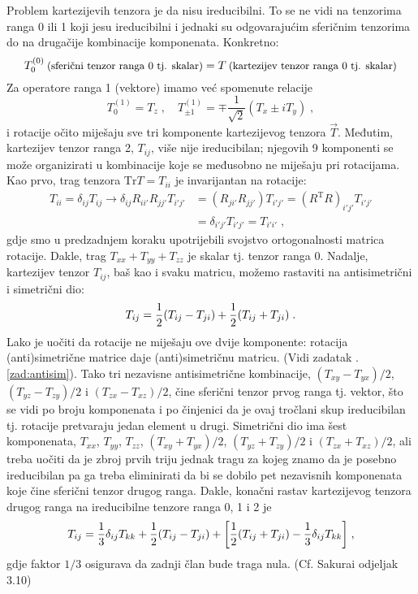 Problem kartezijevih tenzora je da nisu ireducibilni. To se ne
vidi na tenzorima ranga 0 ili 1 koji jesu ireducibilni i jednaki
su odgovarajućim sferičnim tenzorima do na drugačije kombinacije
komponenata. Konkretno:
\begin{equation}
T^{(0)}_0 \: \text{\small (sferični tenzor ranga 0 tj. skalar)}
 = T      \: \text{\small (kartezijev tenzor ranga 0 tj. skalar)}
\end{equation}
Za operatore ranga 1 (vektore) imamo već spomenute relacije
\begin{equation}
T^{(1)}_0 = T_z \;, \quad T^{(1)}_{\pm 1} = \mp \frac{1}{\sqrt{2}}
(T_x \pm i T_y) \;,
\label{eq:kartvektor}
\end{equation}
i rotacije očito miješaju sve tri komponente kartezijevog tenzora
$\vec{T}$. Međutim, kartezijev tenzor ranga 2, $T_{ij}$, više nije
ireducibilan; njegovih 9 komponenti se može organizirati u
kombinacije koje se međusobno ne miješaju pri rotacijama. 
Kao prvo, trag tenzora $\mathrm{Tr} T = T_{ii}$ je invarijantan
na rotacije:
\begin{align}
 T_{ii} = \delta_{ij} T_{ij} \longrightarrow
\delta_{ij} R_{i i'} R_{j j'} T_{i' j'}& = (R_{j i'} R_{j j'}) T_{i' j'}
= (R^{\mathrm{T}} R)_{i' j'} T_{i' j'} \\
& = \delta_{i' j'} T_{i' j'} = T_{i' i'} \;,
\end{align}
gdje smo u predzadnjem koraku upotrijebili svojstvo ortogonalnosti
matrica rotacije. Dakle, trag 
 $T_{xx} + T_{yy} + T_{zz}$ je skalar tj. tenzor ranga 0.
Nadalje, kartezijev tenzor $T_{ij}$, baš kao i svaku matricu, možemo
rastaviti na antisimetrični i simetrični dio:
\begin{equation}
  T_{ij} = \frac{1}{2} (T_{ij} - T_{ji}) + \frac{1}{2} (T_{ij} + T_{ji}) \;.
\label{eq:SplA}
\end{equation}
Lako je uočiti da rotacije ne miješaju ove dvije komponente:
rotacija (anti)si\-met\-ri\-čne matrice daje (anti)simetričnu matricu.
(Vidi zadatak \thechapter.\ref{zad:antisim}).
Tako tri nezavisne antisimetrične kombinacije, $(T_{xy}-T_{yx})/2$,
$(T_{yz}-T_{zy})/2$ i $(T_{zx} - T_{xz})/2$, čine sferični tenzor
prvog ranga tj. vektor, što se vidi po broju komponenata i po
činjenici da je ovaj tročlani skup ireducibilan tj. rotacije
pretvaraju jedan element u drugi.
Simetrični dio ima šest komponenata, $T_{xx}$, $T_{yy}$, $T_{zz}$,
$(T_{xy}+T_{yx})/2$, $(T_{yz}+T_{zy})/2$ i $(T_{zx} + T_{xz})/2$, 
ali treba uočiti da je zbroj prvih triju jednak tragu za kojeg
znamo da je posebno ireducibilan 
pa ga treba eliminirati da bi se dobilo pet
nezavisnih komponenata koje čine sferični tenzor drugog ranga.
Dakle, konačni rastav kartezijevog tenzora drugog ranga na
ireducibilne tenzore ranga 0, 1 i 2 je
\begin{equation}
T_{ij} = \frac{1}{3}\delta_{ij}T_{kk} +
  \frac{1}{2} (T_{ij} - T_{ji}) + 
 \bigg[\frac{1}{2} (T_{ij} + T_{ji}) - \frac{1}{3}\delta_{ij}T_{kk} \bigg] \;,
\end{equation}
gdje faktor $1/3$ osigurava da zadnji član bude traga nula.
(Cf. Sakurai odjeljak 3.10)

